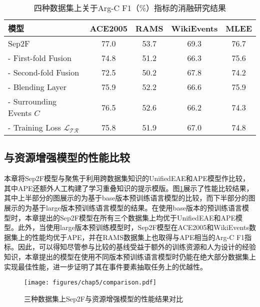 \begin{table}[htp]
\centering
\caption{四种数据集上关于Arg-C F1（\%）指标的消融研究结果}
\begin{tabular}{lcccc}
\toprule
模型 & ACE2005 & RAMS & WikiEvents & MLEE \\ \midrule
Sep2F & 77.0 & 53.7 & 69.3 & 76.7 \\ \midrule
- First-fold Fusion  & 74.8 & 51.2 & 66.3 & 75.6 \\
- Second-fold Fusion  & 72.5 & 50.2 & 67.8 & 74.2 \\
- Blending Layer  & 75.9 & 52.2 & 66.6 & 75.9 \\
- Surrounding Events $C$  & 76.5 & 52.6 & 66.2 & 74.3 \\
- Training Loss $\mathcal{L_\textrm{TR}}$ & 75.8 & 51.9 & 67.0 & 74.8 \\
\bottomrule
\end{tabular}
\label{ablation-Sep2F}
\end{table}

\subsection{与资源增强模型的性能比较}
本章将Sep2F模型与聚焦于利用跨数据集知识的UnifiedEAE和APE模型作比较，其中APE还额外人工构建了学习重叠知识的提示模版。图\ref{cross-dataset}展示了性能比较结果，其中上半部分的图展示的为基于base版本预训练语言模型的比较，而下半部分的图展示的为基于large版本预训练语言模型的结果。在使用base版本的预训练语言模型时，本章提出的Sep2F模型在所有三个数据集上均优于UnifiedEAE和APE模型。此外，当使用large版本预训练模型时，Sep2F模型在ACE2005和WikiEvents数据集上的性能均优于APE，并在RAMS数据集上也取得与APE相当的Arg-C F1指标。因此，可以得知尽管参与比较的基线受益于额外的训练资源和人为设计的经验知识，本章提出的模型在使用不同版本预训练语言模型时仍能在绝大部分数据集上实现最佳性能，进一步证明了其在事件要素抽取任务上的优越性。

\begin{figure}[htp]
\centering
\texttt{[image: figures/chap5/comparison.pdf]}
\caption{三种数据集上Sep2F与资源增强模型的性能结果对比} 
\label{cross-dataset}
\end{figure}

